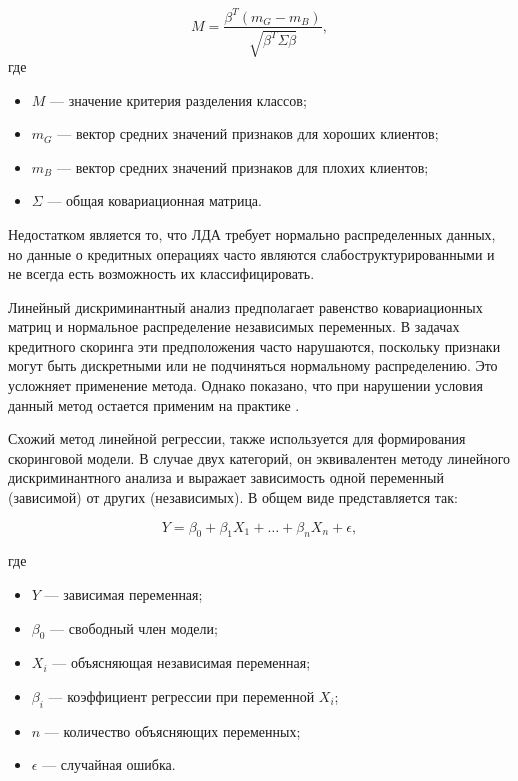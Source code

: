 \begin{equation}
  M = \frac{\beta^T (m_G - m_B)}{\sqrt{\beta^T \Sigma \beta}},
\end{equation}
где
\begin{itemize}
  \item $M$ --- значение критерия разделения классов;
  \item $m_G$ --- вектор средних значений признаков для хороших клиентов;
  \item $m_B$ --- вектор средних значений признаков для плохих клиентов;
  \item $\Sigma$ --- общая ковариационная матрица.
\end{itemize}

Недостатком является то, что ЛДА требует нормально распределенных данных, но данные о кредитных операциях часто являются слабоструктурированными и не всегда есть возможность их классифицировать.

Линейный дискриминантный анализ предполагает равенство ковариационных матриц
и нормальное распределение независимых переменных. В задачах кредитного
скоринга эти предположения часто нарушаются, поскольку признаки могут быть
дискретными или не подчиняться нормальному распределению. Это усложняет
применение метода. Однако показано, что при нарушении условия
данный метод остается применим на практике \cite{Petuhov}.

Схожий метод линейной регрессии, также используется для формирования скоринговой модели. В случае двух категорий, он эквивалентен методу линейного дискриминантного анализа и выражает зависимость одной переменный (зависимой) от других (независимых). В общем виде представляется так:

\begin{equation}
  Y = \beta_0 + \beta_1 X_1 + \ldots + \beta_n X_n + \epsilon,
\end{equation}

где

\begin{itemize}
  \item $Y$ --- зависимая переменная;
  \item $\beta_0$ --- свободный член модели;
  \item $X_i$ --- объясняющая независимая переменная;
  \item $\beta_i$ --- коэффициент регрессии при переменной $X_i$;
  \item $n$ --- количество объясняющих переменных;
  \item $\epsilon$ --- случайная ошибка.
\end{itemize}

